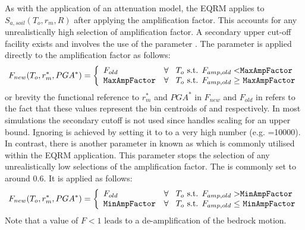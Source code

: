As with the application of an attenuation model, the EQRM applies
 to $S_{a,soil}(T_o,r_m,R)$ after
applying the amplification factor. This accounts for any
unrealistically high selection of amplification factor. A
secondary upper cut-off facility exists and involves the use of
the  parameter .
The  parameter is applied directly to
the amplification factor as follows:
\begin{equation}
\label{eq:regolith-maxampfactor}
F_{new}(T_o,r_m^*,PGA^*) = \left \{ \begin{array}{ll} F_{old} & \textrm{$\forall$ \hspace{0.2em} $T_o$ s.t. $F_{amp,old}<$\typepar{Max}{Amp}{Factor}} \\
\textrm{\typepar{Max}{Amp}{Factor}} & \textrm{$\forall$ \hspace{0.2em} $T_o$ s.t. $F_{amp,old} \geq $ \typepar{Max}{Amp}{Factor}} \\
\end{array} \right.
\end{equation}
or brevity the functional reference to $r_m^*$ and $PGA^*$ in
$F_{new}$ and $F_{old}$ in
refers to the fact that these values represent the bin centroids
of  and 
respectively. In most simulations the secondary cutoff is not used
since  handles scaling for an upper
bound. Ignoring  is achieved by setting
it to to a very high number (e.g.
=10000). In contrast, there is another
parameter in  known as
 which is commonly utilised within the
EQRM application. This parameter stops the selection of any
unrealistically low selections of the amplification factor. The
 is commonly set to around 0.6. It is
applied as follows:
\begin{equation}
\label{eq:regolith-minampfactor}
F_{new}(T_o,r_m^*,PGA^*) = \left \{ \begin{array}{ll} F_{old} & \textrm{$\forall$ \hspace{0.2em} $T_o$ s.t. $F_{amp,old} >$\typepar{Min}{Amp}{Factor}} \\
\textrm{\typepar{Min}{Amp}{Factor}} & \textrm{$\forall$ \hspace{0.2em} $T_o$ s.t. $F_{amp,old} \leq $ \typepar{Min}{Amp}{Factor}} \\
\end{array} \right.
\end{equation}
Note that a value of \mbox{$F<1$} leads to a de-amplification of
the bedrock motion.


